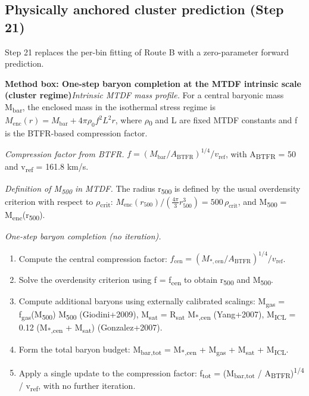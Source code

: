 \documentclass[11pt,a4paper]{article}
\begin{document}
\subsection{Physically anchored cluster prediction (Step 21)}
Step 21 replaces the per-bin fitting of Route B with a zero-parameter forward prediction.

\begin{mdframed}[linecolor=accent,linewidth=0.5pt,backgroundcolor=callout-bg,leftline=true,rightline=true,topline=true,bottomline=true,innerleftmargin=8pt,innerrightmargin=8pt,innertopmargin=6pt,innerbottommargin=6pt]
\textbf{Method box: One-step baryon completion at the MTDF intrinsic scale (cluster regime)}\emph{Intrinsic MTDF mass profile.} For a central baryonic mass M\textsubscript{bar}, the enclosed mass in the isothermal stress regime is
\(M_{\mathrm{enc}}(r) = M_{\mathrm{bar}} + 4\pi\rho_0 f^2 L^2 r\),
where $\rho$\textsubscript{0} and L are fixed MTDF constants and f is the BTFR-based compression factor.

\emph{Compression factor from BTFR.} \(f = (M_{\mathrm{bar}} / A_{\mathrm{BTFR}})^{1/4} / v_{\mathrm{ref}}\), with A\textsubscript{BTFR} = 50 and v\textsubscript{ref} = 161.8 km/\allowbreak{}s.

\emph{Definition of M\textsubscript{500} in MTDF.} The radius r\textsubscript{500} is defined by the usual overdensity criterion with respect to $\rho$\textsubscript{crit}: \(M_{\mathrm{enc}}(r_{500}) / (\frac{4\pi}{3}r_{500}^3) = 500\,\rho_{\mathrm{crit}}\), and M\textsubscript{500} = M\textsubscript{enc}(r\textsubscript{500}).

\emph{One-step baryon completion (no iteration).}

\begin{enumerate}
  \item Compute the central compression factor: \(f_{\mathrm{cen}} = (M_{*,\mathrm{cen}} / A_{\mathrm{BTFR}})^{1/4} / v_{\mathrm{ref}}\).
  \item Solve the overdensity criterion using f = f\textsubscript{cen} to obtain r\textsubscript{500} and M\textsubscript{500}.
  \item Compute additional baryons using externally calibrated scalings:
M\textsubscript{gas} = f\textsubscript{gas}(M\textsubscript{500}) M\textsubscript{500} (Giodini+2009),
M\textsubscript{sat} = R\textsubscript{sat} M\textsubscript{*,cen} (Yang+2007),
M\textsubscript{ICL} = 0.12 (M\textsubscript{*,cen} + M\textsubscript{sat}) (Gonzalez+2007).
  \item Form the total baryon budget: M\textsubscript{bar,tot} = M\textsubscript{*,cen} + M\textsubscript{gas} + M\textsubscript{sat} + M\textsubscript{ICL}.
  \item Apply a single update to the compression factor: f\textsubscript{tot} = (M\textsubscript{bar,tot} / A\textsubscript{BTFR})\textsuperscript{1/\allowbreak{}4} / v\textsubscript{ref}, with no further iteration.
\end{enumerate}
\end{mdframed}
\end{document}
